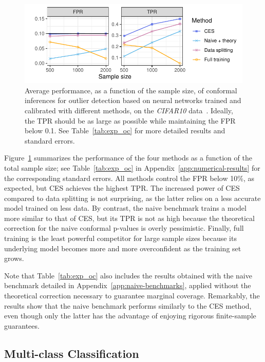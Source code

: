 \begin{figure}[!htb]
    \centering
    \includegraphics[width=\linewidth]{figures/exp_oc.pdf}\vspace{-0.5cm}
    \caption{Average performance, as a function of the sample size, of conformal inferences for outlier detection based on neural networks trained and calibrated with different methods, on the {\em CIFAR10} data~\cite{cifar10}. Ideally, the TPR should be as large as possible while maintaining the FPR below 0.1. See Table~\ref{tab:exp_oc} for more detailed results and standard errors.}%
    \label{fig:exp_oc}
\end{figure}

Figure~\ref{fig:exp_oc} summarizes the performance of the four methods as a function of the total sample size; see Table~\ref{tab:exp_oc} in Appendix~\ref{app:numerical-results} for the corresponding standard errors. All methods control the FPR below 10\%, as expected, but CES achieves the highest TPR.
The increased power of CES compared to data splitting is not surprising, as the latter relies on a less accurate model trained on less data.
By contrast, the naive benchmark trains a model more similar to that of CES, but its TPR is not as high because the theoretical correction for the naive conformal p-values is overly pessimistic.
Finally, full training is the least powerful competitor for large sample sizes because its underlying model becomes more and more overconfident as the training set grows.

Note that Table~\ref{tab:exp_oc} also includes the results obtained with the naive benchmark detailed in Appendix~\ref{app:naive-benchmarks}, applied without the theoretical correction necessary to guarantee marginal coverage. Remarkably, the results show that the naive benchmark performs similarly to the CES method, even though only the latter has the advantage of enjoying rigorous finite-sample guarantees.

\subsection{Multi-class Classification} \label{sec:num_mc}

